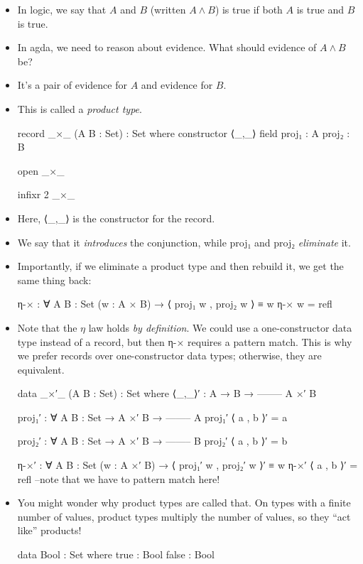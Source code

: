 \documentclass{lecturenotes}
\begin{document}
\begin{itemize}
\item In logic, we say that $A$ and $B$ (written $A \land B$) is true if both $A$ is true and $B$ is true.
\item In agda, we need to reason about evidence.
  What should evidence of $A \land B$ be?
\item It's a pair of evidence for $A$ and evidence for $B$.
\item This is called a \emph{product type}.
\begin{code}
record _×_ (A B : Set) : Set where
  constructor ⟨_,_⟩
  field
    proj₁ : A
    proj₂ : B

open _×_

infixr 2 _×_
\end{code}
\item Here, \textsf{⟨\_,\_⟩} is the constructor for the record.
\item We say that it \emph{introduces} the conjunction, while \textsf{proj₁} and \textsf{proj₂} \emph{eliminate} it.
\item Importantly, if we eliminate a product type and then rebuild it, we get the same thing back:
\begin{code}
η-× : ∀ {A B : Set} (w : A × B) → ⟨ proj₁ w , proj₂ w ⟩ ≡ w
η-× w = refl
\end{code}
\pagebreak
\item Note that the $\eta$ law holds \emph{by definition}.
  We could use a one-constructor data type instead of a record, but then \textsf{η-×} requires a pattern match.
  This is why we prefer records over one-constructor data types; otherwise, they are equivalent.
\begin{code}
data _×′_ (A B : Set) : Set where
  ⟨_,_⟩′ :
     A →
     B →
  --------
   A ×′ B

proj₁′ : ∀ {A B : Set} →
  A ×′ B →
  --------
     A
proj₁′ ⟨ a , b ⟩′ = a

proj₂′ : ∀ {A B : Set} →
  A ×′ B →
  --------
      B
proj₂′ ⟨ a , b ⟩′ = b

η-×′ : ∀ {A B : Set} (w : A ×′ B) → ⟨ proj₁′ w , proj₂′ w ⟩′ ≡ w
η-×′ ⟨ a , b ⟩′ = refl --note that we have to pattern match here!
\end{code}
\item You might wonder why product types are called that.
  On types with a finite number of values, product types multiply the number of values, so they ``act like'' products!
\begin{code}
data Bool : Set where
  true : Bool
  false : Bool


\end{code}
\end{itemize}
\end{document}

